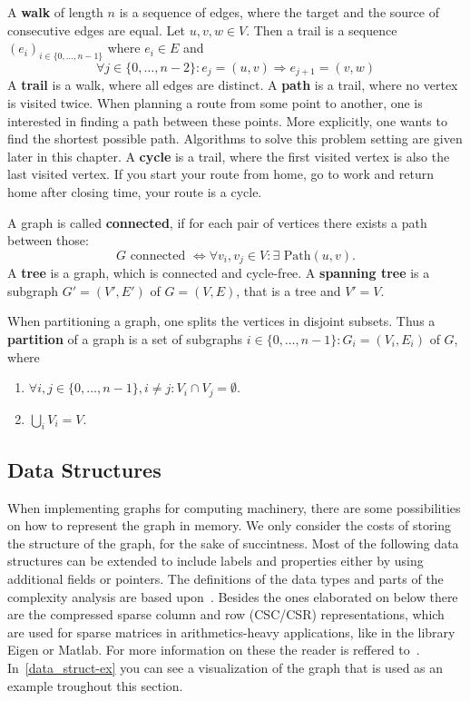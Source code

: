             A \textbf{walk} of length $n$ is a sequence of edges, where the target and the source of consecutive edges are equal. Let $u,v,w \in V$. Then a trail is a sequence $(e_i)_{i \in \{0, \dots, n-1\}}$ where $e_i \in E$ and
            \[ \forall j \in \{0, \dots, n-2\}: e_j = (u, v) \Rightarrow e_{j+1} = (v, w)\] 
            A \textbf{trail} is a walk, where all edges are distinct. 
            A \textbf{path} is a trail, where no vertex is visited twice.
            When planning a route from some point to another, one is interested in finding a path between these points.
            More explicitly, one wants to find the shortest possible path. 
            Algorithms to solve this problem setting are given later in this chapter. A \textbf{cycle} is a trail, where the first visited vertex is also the last visited vertex. 
            If you start your route from home, go to work and return home after closing time, your route is a cycle.
            
            A graph is called \textbf{connected}, if for each pair of vertices there exists a path between those: 
            \[G \text{ connected } \Leftrightarrow \forall v_i, v_j \in V: \exists \text{ Path}(u, v).\]
            A \textbf{tree} is a graph, which is connected and cycle-free. 
            A \textbf{spanning tree} is a subgraph $G' = (V', E')$ of $G = (V, E)$, that is a tree and $V' = V$. 
            
            When partitioning a graph, one splits the vertices in disjoint subsets. 
            Thus a \textbf{partition} of a graph is a set of subgraphs $i\in \{0, \dots, n-1\}: G_i = (V_i, E_i)$ of $G$, where 
            \begin{enumerate}
             \item $\forall i,j \in \{0, \dots, n-1\}, i \neq j: V_i \cap V_j = \emptyset$.
             \item $\bigcup_i V_i = V$.
            \end{enumerate}
            
    \subsection{Data Structures}\label{\positionnumber}
        When implementing graphs for computing machinery, there are some possibilities on how to represent the graph in memory.
        We only consider the costs of storing the structure of the graph, for the sake of succintness. 
        Most of the following data structures can be extended to include labels and properties either by using additional fields or pointers. 
        The definitions of the data types and parts of the complexity analysis are based upon~\autocite{Gross1998GraphTA, aho1974design, cormen2009introduction, Goodrich2014AlgorithmDA, steinhaus2010g}. 
        Besides the ones elaborated on below there are the compressed sparse column and row (CSC/CSR) representations, which are used for sparse matrices in arithmetics-heavy applications, like in the library Eigen or Matlab. 
        For more information on these the reader is reffered to~\autocite{steinhaus2010g, Eisenstat1982YaleSM}. In~\ref{data_struct-ex} you can see a visualization of the graph that is used as an example troughout this section.
        
